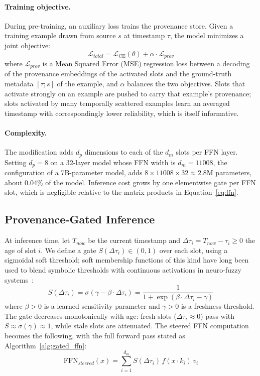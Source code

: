\documentclass[10pt]{article}
\begin{document}
\paragraph{Training objective.} During pre-training, an auxiliary loss trains the provenance store. Given a training example drawn from source $s$ at timestamp $\tau$, the model minimizes a joint objective:
\begin{equation}
  \mathcal{L}_{total} = \mathcal{L}_{\text{CE}}(\theta) + \alpha \cdot \mathcal{L}_{prov}
\end{equation}
where $\mathcal{L}_{prov}$ is a Mean Squared Error (MSE) regression loss between a decoding of the provenance embeddings of the activated slots and the ground-truth metadata $[\tau; s]$ of the example, and $\alpha$ balances the two objectives. Slots that activate strongly on an example are pushed to carry that example's provenance; slots activated by many temporally scattered examples learn an averaged timestamp with correspondingly lower reliability, which is itself informative.

\paragraph{Complexity.} The modification adds $d_p$ dimensions to each of the $d_m$ slots per FFN layer. Setting $d_p = 8$ on a 32-layer model whose FFN width is $d_m = 11008$, the configuration of a 7B-parameter model, adds $8 \times 11008 \times 32 \approx 2.8$M parameters, about $0.04\%$ of the model. Inference cost grows by one elementwise gate per FFN slot, which is negligible relative to the matrix products in Equation~\ref{eq:ffn}.

\subsection{Provenance-Gated Inference}
\label{sec:gating}

At inference time, let $T_{now}$ be the current timestamp and $\Delta\tau_i = T_{now} - \tau_i \geq 0$ the age of slot $i$. We define a gate $S(\Delta\tau_i) \in (0, 1)$ over each slot, using a sigmoidal soft threshold; soft membership functions of this kind have long been used to blend symbolic thresholds with continuous activations in neuro-fuzzy systems~\citep{thakur2021neurofuzzy}:
\begin{equation}
  \label{eq:gate}
  S(\Delta\tau_i) = \sigma\!\left( \gamma - \beta \cdot \Delta\tau_i \right)
  = \frac{1}{1 + \exp\!\left(\beta \cdot \Delta\tau_i - \gamma\right)}
\end{equation}
where $\beta > 0$ is a learned sensitivity parameter and $\gamma > 0$ is a freshness threshold. The gate decreases monotonically with age: fresh slots ($\Delta\tau_i \approx 0$) pass with $S \approx \sigma(\gamma) \approx 1$, while stale slots are attenuated. The steered FFN computation becomes the following, with the full forward pass stated as Algorithm~\ref{alg:gated_ffn}:
\begin{equation}
  \label{eq:steering}
  \text{FFN}_{steered}(x) = \sum_{i=1}^{d_m} S(\Delta\tau_i)\, f(x \cdot k_i)\, v_i
\end{equation}
\end{document}

